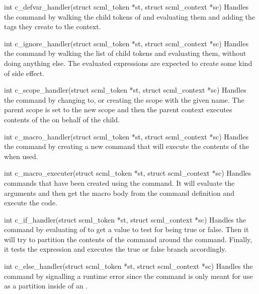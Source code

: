 \begin{cprototypelist}
  \item[int c_defvar_handler(struct scml_token *st, struct
  scml_context *sc)] Handles the  command by walking the
  child tokens of  and evaluating them and adding the tags they
  create to the context.

  \item[int c_ignore_handler(struct scml_token *st, struct
  scml_context *sc)] Handles the  command by walking the
  list of child tokens and evaluating them, without doing anything else.  The
  evaluated expressions are expected to create some kind of side effect.

  \item[int c_scope_handler(struct scml_token *st, struct
  scml_context *sc)] Handles the  command by changing to,
  or creating the scope with the given name.  The parent scope is set to the
  new scope and then the parent context executes contents of the
   on behalf of the child.

  \item[int c_macro_handler(struct scml_token *st, struct
  scml_context *sc)] Handles the  command by creating a new
  command that will execute the contents of the  when used.

  \item[int c_macro_executer(struct scml_token *st, struct
  scml_context *sc)] Handles commands that have been created using the
   command.  It will evaluate the arguments and then get the
  macro body from the command definition and execute the \SCML{} code.

  \item[int c_if_handler(struct scml_token *st, struct
  scml_context *sc)] Handles the  command by evaluating
   of  to get a value to test for
  being true or false.  Then it will try to partition the contents of the
  command around the  command.  Finally, it tests the
  expression and executes the true or false branch accordingly.

  \item[int c_else_handler(struct scml_token *st, struct
  scml_context *sc)] Handles the  command by signalling a
  runtime error since the command is only meant for use as a partition inside
  of an .


\end{cprototypelist}
